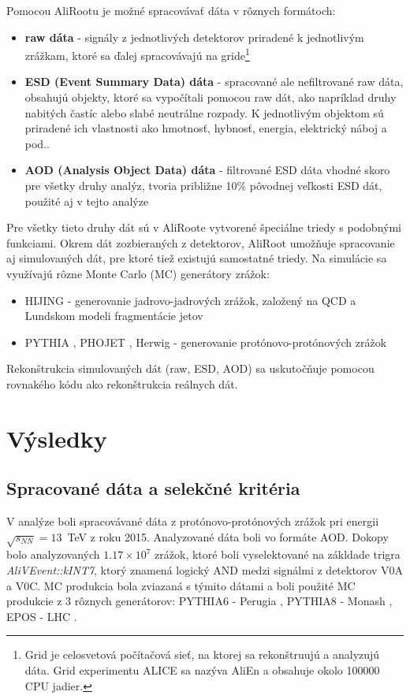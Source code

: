 \documentclass[thesismargins, thesislinespacing]{rnthesis}
\begin{document}
Pomocou AliRootu je možné spracovávať dáta v rôznych formátoch:
\begin{itemize}
	\item \textbf {raw dáta} - signály z jednotlivých detektorov priradené k jednotlivým zrážkam, ktoré sa ďalej spracovávajú na gride\footnote{Grid je celosvetová počítačová sieť, na ktorej sa rekonštruujú a analyzujú dáta. Grid experimentu ALICE sa nazýva AliEn a obsahuje okolo 100000 CPU jadier.} 
	\item \textbf {ESD (Event Summary Data) dáta} - spracované ale nefiltrované raw dáta, obsahujú objekty, ktoré sa vypočítali pomocou raw dát, ako napríklad druhy nabitých častíc alebo slabé neutrálne rozpady. K jednotlivým objektom sú priradené ich vlastnosti ako hmotnosť, hybnosť, energia, elektrický náboj a pod..
	\item \textbf {AOD (Analysis Object Data) dáta} - filtrované ESD dáta vhodné skoro pre všetky druhy analýz, tvoria približne 10\% pôvodnej veľkosti ESD dát, použité aj v tejto analýze
\end{itemize}

Pre všetky tieto druhy dát sú v AliRoote vytvorené špeciálne triedy s podobnými funkciami. Okrem dát zozbieraných z detektorov, AliRoot umožňuje spracovanie aj simulovaných dát, pre ktoré tiež existujú samostatné triedy. Na simulácie sa využívajú rôzne Monte Carlo (MC) generátory zrážok:
\begin{itemize}
	\item HIJING \cite{hijing} - generovanie jadrovo-jadrových zrážok, založený na QCD a Lundskom modeli fragmentácie jetov
	\item PYTHIA \cite{pythia}, PHOJET \cite{phojet}, Herwig \cite{herwig} - generovanie protónovo-protónových zrážok
\end{itemize}

Rekonštrukcia simulovaných dát (raw, ESD, AOD) sa uskutočňuje pomocou rovnakého kódu ako rekonštrukcia reálnych dát.

\chapter{Výsledky}

\section{Spracované dáta a selekčné kritéria}
V analýze boli spracovávané dáta z protónovo-protónových zrážok pri energii $\sqrt{s_{NN}}=13$~TeV z roku 2015. Analyzované dáta boli vo formáte AOD. Dokopy bolo analyzovaných $1.17\times10^7$ zrážok, ktoré boli vyselektované na zákldade trigra \textit{AliVEvent::kINT7}, ktorý znamená logický AND medzi signálmi z detektorov V0A a V0C.
MC produkcia bola zviazaná s týmito dátami a boli použité MC produkcie z 3 rôznych generátorov: PYTHIA6 - Perugia \cite{perugia} , PYTHIA8 - Monash \cite{monash}, EPOS - LHC \cite{epos}. 
\end{document}
